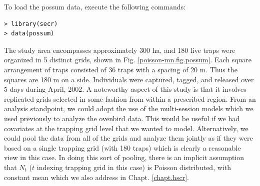 To load the possum data, execute the following commands:
\begin{verbatim}
> library(secr)
> data(possum)
\end{verbatim}
The study area encompasses approximately 300 ha, and 180 live traps
were
organized in 5 distinct grids, shown in  Fig. \ref{poisson-mn.fig.possum}.
Each square arrangement of traps consisted of
36 traps with a spacing of 20 m. Thus the squares are 180 m on a
side.
Individuals were captured, tagged, and released over 5 days during
April, 2002.
A noteworthy aspect of this study is that it involves replicated
grids selected in some fashion
from within a prescribed region.
From an analysis standpoint, we could adopt the use of the
multi-session models which we used previously to analyze the ovenbird
data. This would be useful if we had covariates at the trapping grid
level that we wanted to model.   Alternatively, we could pool the data
from all of the grids and analyze them jointly as if they were based
on a single trapping grid (with 180 traps) which is clearly a reasonable view in this case.
In doing this sort of pooling, there is
an implicit assumption that $N_{t}$ ($t$ indexing trapping grid in
this case) is Poisson distributed, with
constant mean \citep{royle:2004abc, royle_etal:2012arXiv} which we also
address in Chapt. \ref{chapt.hscr}.


